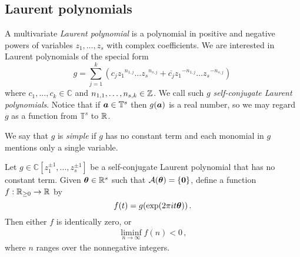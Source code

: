 \subsection{Laurent polynomials}

A multivariate \emph{Laurent polynomial} is a polynomial in positive and negative powers of variables $z_{1}, \ldots, z_{s}$ with complex coefficients. We are interested in Laurent polynomials of the special form
\[ g = \sum_{j=1}^k \left( c_j {z_1}^{n_{1,j}}\ldots {z_s}^{n_{s,j}} +
    \overline{c_j} {z_1}^{-n_{1,j}}\ldots {z_s}^{-n_{s,j}} \right) \,
\]
where $c_1,\ldots,c_k \in \mathbb{C}$ and $n_{1,1},\ldots,n_{s,k} \in \mathbb{Z}$.  We call such $g$ \emph{self-conjugate Laurent polynomials}.  Notice that if $\boldsymbol{a} \in \mathbb{T}^{s}$ then $g(\boldsymbol{a})$ is a real number, so we may regard $g$ as a function from $\mathbb{T}^{s}$ to $\mathbb{R}$.

We say that $g$ is \emph{simple} if $g$ has no constant term and
each monomial in $g$ mentions only a single variable.

\begin{lemma}
\label{lem:first_bound}
Let $g \in \mathbb{C}[z^{\pm 1}_1,\ldots,z^{\pm 1}_s]$ be a self-conjugate Laurent polynomial that has no constant term.
Given $\boldsymbol{\theta} \in \mathbb{R}^{s}$ such that ${\cal{A}}(\boldsymbol{\theta}) = \lbrace \boldsymbol{0} \rbrace$, define a function $f: \mathbb{R}_{\geq 0} \rightarrow \mathbb{R}$ by
\[ f(t) = g(\exp(2 \pi i t \boldsymbol{\theta})) \, .\]
Then either $f$ is identically zero, or
\begin{align*}
\liminf\limits_{n\rightarrow\infty} f(n) < 0 \, ,
\end{align*}
where $n$ ranges over the nonnegative integers.
\end{lemma}

